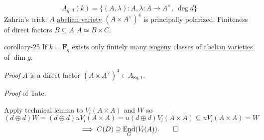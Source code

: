 \documentclass[10pt,]{book}
\makeatletter
\renewcommand*{\proofname}{Proof}
\renewenvironment{proof}[1][\proofname]{\par
  \pushQED{\qed}%
  \normalfont \topsep6\p@\@plus6\p@\relax
  \trivlist
  \item\relax
    {\itshape
    #1\@addpunct{.}}\hspace\labelsep\ignorespaces
}{%
  \popQED\endtrivlist\@endpefalse
}
\numberwithin{equation}{section}
\newcommand{\FF}{\mathbf{F}}
\DeclareMathOperator{\End}{End}
\makeatother
\begin{document}
\hypertarget{p-397}{}%
%
\begin{equation*}
A_{g,d}( k) = \{(A,\lambda) : A , \lambda \colon A \to A^\vee,\ \deg d \}
\end{equation*}
Zahrin's trick: \(A\) \hyperref[def-buntes-abvar]{abelian variety} \((A\times A^\vee)^4\) is principally polarized. Finiteness of direct factors \(B\subseteq A\) \(A\simeq B\times C\).%
\begin{corollary}{}{}{corollary-25}%
\hypertarget{p-398}{}%
If \(k = \FF_q\) exists only finitely many \hyperref[def-supersing-isog-isog]{isogeny} classes of \hyperref[def-buntes-abvar]{abelian varieties} of \(\dim g\).%
\end{corollary}
\begin{proof}\hypertarget{proof-68}{}
\hypertarget{p-399}{}%
\(A\) is a direct factor \((A\times A^\vee)^4 \in A_{8g,1}\).%
\end{proof}
\begin{proof}\hypertarget{proof-69}{}
\hypertarget{p-400}{}%
of Tate.%
\par
\hypertarget{p-401}{}%
Apply technical lemma to \(V_l(A\times A)\) and \(W\) so%
\begin{equation*}
(d\oplus d) W = (d \oplus d) uV_l(A\times A) = u(d\oplus d) V_l(A\times A) \subseteq uV_l(A\times A) = W
\end{equation*}
%
\begin{equation*}
\implies C(D) \supseteq \End_G(V_l(A))\text{.}\qedhere
\end{equation*}
%
\end{proof}
%
%
\typeout{************************************************}
\typeout{************************************************}
%
\end{document}
